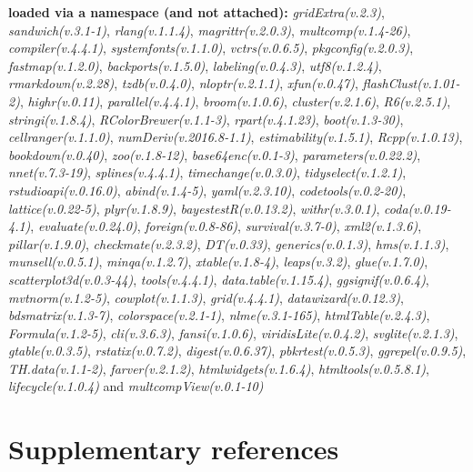\documentclass[
  bookmarksnumbered]{article}
\begin{document}
\textbf{loaded via a namespace (and not attached):}
\emph{gridExtra(v.2.3)}, \emph{sandwich(v.3.1-1)}, \emph{rlang(v.1.1.4)}, \emph{magrittr(v.2.0.3)}, \emph{multcomp(v.1.4-26)}, \emph{compiler(v.4.4.1)}, \emph{systemfonts(v.1.1.0)}, \emph{vctrs(v.0.6.5)}, \emph{pkgconfig(v.2.0.3)}, \emph{fastmap(v.1.2.0)}, \emph{backports(v.1.5.0)}, \emph{labeling(v.0.4.3)}, \emph{utf8(v.1.2.4)}, \emph{rmarkdown(v.2.28)}, \emph{tzdb(v.0.4.0)}, \emph{nloptr(v.2.1.1)}, \emph{xfun(v.0.47)}, \emph{flashClust(v.1.01-2)}, \emph{highr(v.0.11)}, \emph{parallel(v.4.4.1)}, \emph{broom(v.1.0.6)}, \emph{cluster(v.2.1.6)}, \emph{R6(v.2.5.1)}, \emph{stringi(v.1.8.4)}, \emph{RColorBrewer(v.1.1-3)}, \emph{rpart(v.4.1.23)}, \emph{boot(v.1.3-30)}, \emph{cellranger(v.1.1.0)}, \emph{numDeriv(v.2016.8-1.1)}, \emph{estimability(v.1.5.1)}, \emph{Rcpp(v.1.0.13)}, \emph{bookdown(v.0.40)}, \emph{zoo(v.1.8-12)}, \emph{base64enc(v.0.1-3)}, \emph{parameters(v.0.22.2)}, \emph{nnet(v.7.3-19)}, \emph{splines(v.4.4.1)}, \emph{timechange(v.0.3.0)}, \emph{tidyselect(v.1.2.1)}, \emph{rstudioapi(v.0.16.0)}, \emph{abind(v.1.4-5)}, \emph{yaml(v.2.3.10)}, \emph{codetools(v.0.2-20)}, \emph{lattice(v.0.22-5)}, \emph{plyr(v.1.8.9)}, \emph{bayestestR(v.0.13.2)}, \emph{withr(v.3.0.1)}, \emph{coda(v.0.19-4.1)}, \emph{evaluate(v.0.24.0)}, \emph{foreign(v.0.8-86)}, \emph{survival(v.3.7-0)}, \emph{xml2(v.1.3.6)}, \emph{pillar(v.1.9.0)}, \emph{checkmate(v.2.3.2)}, \emph{DT(v.0.33)}, \emph{generics(v.0.1.3)}, \emph{hms(v.1.1.3)}, \emph{munsell(v.0.5.1)}, \emph{minqa(v.1.2.7)}, \emph{xtable(v.1.8-4)}, \emph{leaps(v.3.2)}, \emph{glue(v.1.7.0)}, \emph{scatterplot3d(v.0.3-44)}, \emph{tools(v.4.4.1)}, \emph{data.table(v.1.15.4)}, \emph{ggsignif(v.0.6.4)}, \emph{mvtnorm(v.1.2-5)}, \emph{cowplot(v.1.1.3)}, \emph{grid(v.4.4.1)}, \emph{datawizard(v.0.12.3)}, \emph{bdsmatrix(v.1.3-7)}, \emph{colorspace(v.2.1-1)}, \emph{nlme(v.3.1-165)}, \emph{htmlTable(v.2.4.3)}, \emph{Formula(v.1.2-5)}, \emph{cli(v.3.6.3)}, \emph{fansi(v.1.0.6)}, \emph{viridisLite(v.0.4.2)}, \emph{svglite(v.2.1.3)}, \emph{gtable(v.0.3.5)}, \emph{rstatix(v.0.7.2)}, \emph{digest(v.0.6.37)}, \emph{pbkrtest(v.0.5.3)}, \emph{ggrepel(v.0.9.5)}, \emph{TH.data(v.1.1-2)}, \emph{farver(v.2.1.2)}, \emph{htmlwidgets(v.1.6.4)}, \emph{htmltools(v.0.5.8.1)}, \emph{lifecycle(v.1.0.4)} and \emph{multcompView(v.0.1-10)}

\section{Supplementary references}\label{refs}

\begin{multicols}{2}
\AtNextBibliography{\footnotesize}
\printbibliography[heading=none]
\normalsize
\end{multicols}

\def\printbibliography{}

\printbibliography
\end{document}
